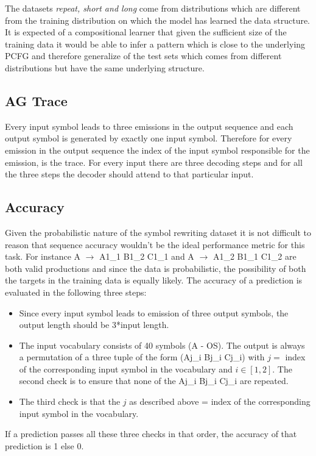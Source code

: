 The datasets \textit{repeat, short and long} come from distributions which are different from the training distribution on which the model has learned the data structure. It is expected of a compositional learner that given the sufficient size of the training data it would be able to infer a pattern which is close to the underlying PCFG and therefore generalize of the test sets which comes from different distributions but have the same underlying structure.

\subsection{AG Trace}\label{sr:trace}
Every input symbol leads to three emissions in the output sequence and each output symbol is generated by exactly one input symbol. Therefore for every emission in the output sequence the index of the input symbol responsible for the emission, is the trace. For every input there are three decoding steps and for all the three steps the decoder should attend to that particular input.


\subsection{Accuracy}\label{sr:acc_desc}
Given the probabilistic nature of the symbol rewriting dataset it is not difficult to reason that sequence accuracy wouldn't be the ideal performance metric for this task. For instance A $\rightarrow$ A1\_1 B1\_2 C1\_1 and A $\rightarrow$ A1\_2 B1\_1 C1\_2 are both valid productions and since the data is probabilistic, the possibility of both the targets in the training data is equally likely. The accuracy of a prediction is evaluated in the following three steps:
\begin{itemize}
	\item Since every input symbol leads to emission of three output symbols, the output length should be 3*input length.
	\item The input vocabulary consists of 40 symbols (A - OS). The output is always a permutation of a three tuple of the form (Aj\_i Bj\_i Cj\_i) with $j=$ index of the corresponding input symbol in the vocabulary and $i \in [1, 2] $. The second check is to ensure that none of the Aj\_i Bj\_i Cj\_i are repeated.
	\item The third check is that the $j$ as described above = index of the corresponding input symbol in the vocabulary.
\end{itemize}
If a prediction passes all these three checks in that order, the accuracy of that prediction is 1 else 0.

